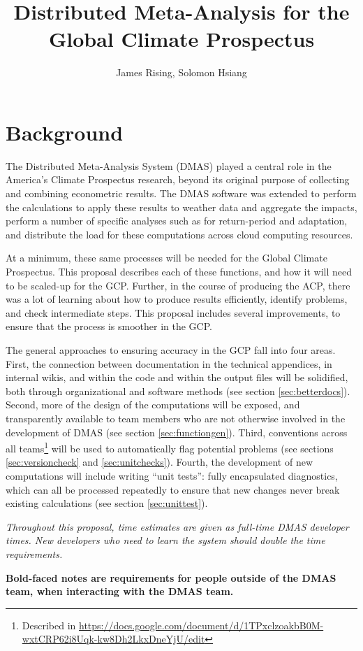 \documentclass[12pt, oneside]{amsart}
\title{Distributed Meta-Analysis for the Global Climate Prospectus}
\author{James Rising, Solomon Hsiang}
\begin{document}
\section{Background}

The Distributed Meta-Analysis System (DMAS) played a central role in the America's Climate Prospectus research, beyond its original purpose of collecting and combining econometric results.  The DMAS software was extended to perform the calculations to apply these results to weather data and aggregate the impacts, perform a number of specific analyses such as for return-period and adaptation, and distribute the load for these computations across cloud computing resources.

At a minimum, these same processes will be needed for the Global Climate Prospectus.  This proposal describes each of these functions, and how it will need to be scaled-up for the GCP.  Further, in the course of producing the ACP, there was a lot of learning about how to produce results efficiently, identify problems, and check intermediate steps.  This proposal includes several improvements, to ensure that the process is smoother in the GCP.

The general approaches to ensuring accuracy in the GCP fall into four areas.  First, the connection between documentation in the technical appendices, in internal wikis, and within the code and within the output files will be solidified, both through organizational and software methods (see section \ref{sec:betterdocs}).  Second, more of the design of the computations will be exposed, and transparently available to team members who are not otherwise involved in the development of DMAS (see section \ref{sec:functiongen}).  Third, conventions across all teams\footnote{Described in \url{https://docs.google.com/document/d/1TPxclzoakbB0M-wxtCRP62i8Uqk-kw8Dh2LkxDneYjU/edit}} will be used to automatically flag potential problems (see sections \ref{sec:versioncheck} and \ref{sec:unitchecks}).  Fourth, the development of new computations will include writing ``unit tests'': fully encapsulated diagnostics, which can all be processed repeatedly to ensure that new changes never break existing calculations (see section \ref{sec:unittest}).

{\it Throughout this proposal, time estimates are given as full-time DMAS developer times.  New developers who need to learn the system should double the time requirements.}

{\bf Bold-faced notes are requirements for people outside of the DMAS team, when interacting with the DMAS team.}
\end{document}
